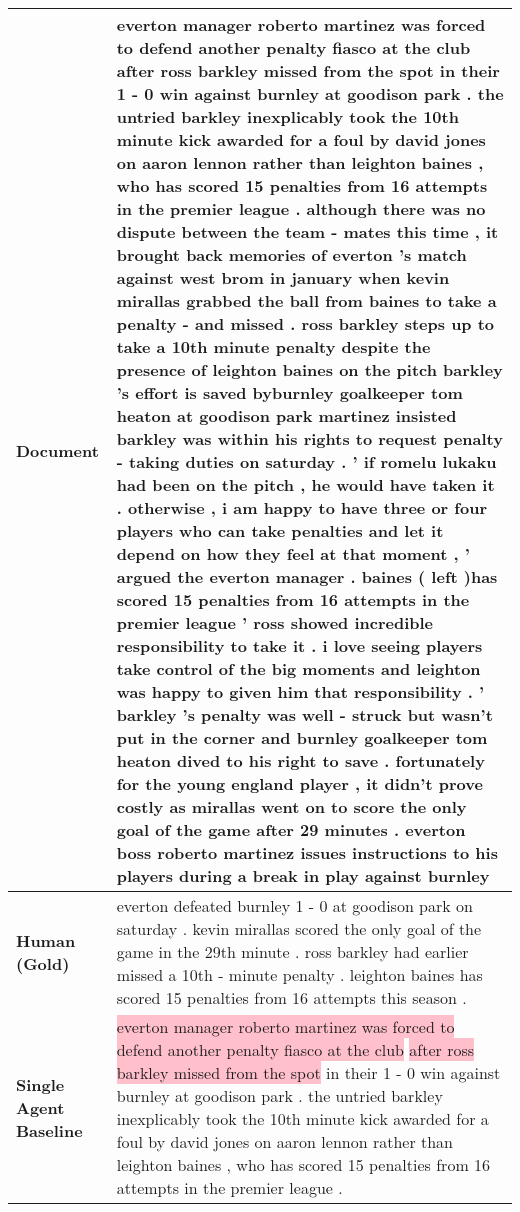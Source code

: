 \documentclass[11pt,a4paper]{article}
\begin{document}
\begin{table*}[t]
    \centering
\begin{center}
    \begin{tabular}{|P{1.5cm}@{}| p{13.8cm}|}
    \hline
    \small \textbf{Document} & everton manager roberto martinez was forced to defend another penalty fiasco at the club after ross barkley missed from the spot in their 1 - 0 win against burnley at goodison park .   the untried barkley inexplicably took the 10th minute kick  awarded for a foul by david jones on aaron lennon  rather than leighton baines ,  who has scored 15 penalties from 16 attempts in the premier league .   although there was no dispute between the team - mates this time ,  it brought back memories of everton 's match against west brom in january when kevin mirallas grabbed the ball from baines to take a penalty  -  and missed .   ross barkley steps up to take a 10th minute penalty despite the presence of leighton baines on the pitch  barkley 's effort is saved byburnley goalkeeper tom heaton at goodison park  martinez insisted barkley was within his rights to request penalty - taking duties on saturday .  ' if romelu lukaku had been on the pitch ,  he would have taken it .  otherwise ,  i am happy to have three or four players who can take penalties and let it depend on how they feel at that moment ,  ' argued the everton manager .   baines ( left )has scored 15 penalties from 16 attempts in the premier league ' ross showed incredible responsibility to take it .  i love seeing players take control of the big moments and leighton was happy to given him that responsibility .  ' barkley 's penalty was well - struck but wasn't put in the corner and burnley goalkeeper tom heaton dived to his right to save .   fortunately for the young england player ,  it didn't prove costly as mirallas went on to score the only goal of the game after 29 minutes .   everton boss roberto martinez issues instructions to his players during a break in play against burnley
    \\ \hline
    \small  \textbf{Human (Gold)}  & everton defeated burnley 1 - 0 at goodison park on saturday . kevin mirallas scored the only goal of the game in the 29th minute . ross barkley had earlier missed a 10th - minute penalty . leighton baines has scored 15 penalties from 16 attempts this season .
 \\ \hline
\small  \textbf{Single Agent Baseline} & \colorbox{pink}{everton manager roberto martinez was forced to defend another penalty fiasco at the club} \colorbox{pink}{after ross barkley missed from the spot} in their 1 - 0 win against burnley at goodison park . the untried barkley inexplicably took the 10th minute kick awarded for a foul by david jones on aaron lennon rather than leighton baines , who has scored 15 penalties from 16 attempts in the premier league .

\end{tabular}
\end{center}
\end{table*}
\end{document}
